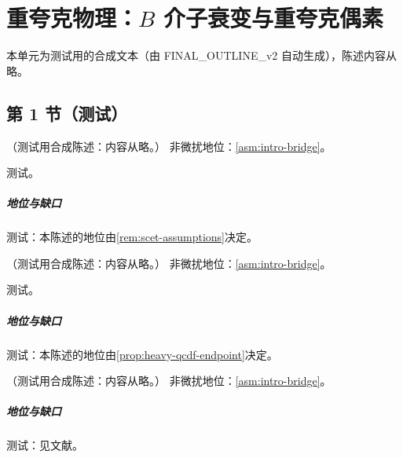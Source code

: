 \chapter{重夸克物理：$B$ 介子衰变与重夸克偶素}\label{ch:heavy}
本单元为测试用的合成文本（由 FINAL\_OUTLINE\_v2 自动生成），陈述内容从略。

\section{第 1 节（测试）}\label{sec:heavy-bdpi}

\begin{theorem}\label{thm:heavy-bdpi}
（测试用合成陈述：内容从略。）
非微扰地位：\cref{asm:intro-bridge}。
\end{theorem}
\begin{proofsketch}测试。\end{proofsketch}
\paragraph{地位与缺口}测试：本陈述的地位由\cref{rem:scet-assumptions}决定。

\begin{proposition}\label{prop:heavy-btopi-ff}
（测试用合成陈述：内容从略。）
非微扰地位：\cref{asm:intro-bridge}。
\end{proposition}
\begin{proofsketch}测试。\end{proofsketch}
\paragraph{地位与缺口}测试：本陈述的地位由\cref{prop:heavy-qcdf-endpoint}决定。

\begin{proposition}\label{prop:heavy-qcdf-lp}
（测试用合成陈述：内容从略。）
非微扰地位：\cref{asm:intro-bridge}。
\end{proposition}
\paragraph{地位与缺口}测试：见文献。

